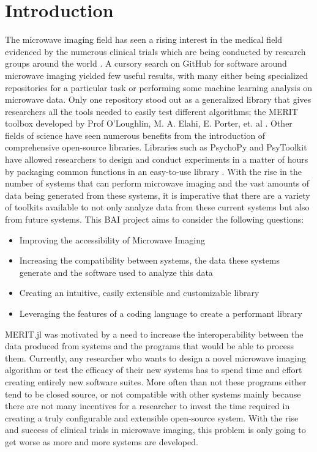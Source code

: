 \chapter*{Introduction}
The microwave imaging field has seen a rising interest in the medical field evidenced by the numerous clinical trials
which are being conducted by research groups around the world \cite{preeceMARIAM4Clinical2016,
moloneyWaveliaMicrowaveBreast2021, e.c.fearMicrowaveBreastImaging2013}. A cursory search on GitHub for software around
microwave imaging yielded few useful results, with many either being specialized repositories for a particular task or
performing some machine learning analysis on microwave data. Only one repository stood out as a generalized library that
gives researchers all the tools needed to easily test different algorithms; the MERIT toolbox developed by Prof
O'Loughlin, M. A. Elahi, E. Porter, et. al \cite{d.oloughlinOpensourceSoftwareMicrowave2018}. Other fields of science
have seen numerous benefits from the introduction of comprehensive open-source libraries. Libraries such as PsychoPy and
PsyToolkit have allowed researchers to design and conduct experiments in a matter of hours by packaging common functions
in an easy-to-use library \cite{stoetPsyToolkitTestimonials}. With the rise in the number of systems that can perform
microwave imaging and the vast amounts of data being generated from these systems, it is imperative that there are a
variety of toolkits available to not only analyze data from these current systems but also from future systems. This BAI
project aims to consider the following questions:
\begin{itemize}
    \item Improving the accessibility of Microwave Imaging
    \item Increasing the compatibility between systems, the data these systems generate and the software used to analyze
    this data
    \item Creating an intuitive, easily extensible and customizable library
    \item Leveraging the features of a coding language to create a performant library   
\end{itemize}



MERIT.jl was motivated by a need to increase the interoperability between the data produced from systems and the
programs that would be able to process them. Currently, any researcher who wants to design a novel microwave imaging
algorithm or test the efficacy of their new systems has to spend time and effort creating entirely new software suites.
More often than not these programs either tend to be closed source, or not compatible with other systems mainly because
there are not many incentives for a researcher to invest the time required in creating a truly configurable and
extensible open-source system. With the rise and success of clinical trials in microwave imaging, this problem is only
going to get worse as more and more systems are developed.  \hfill \break

